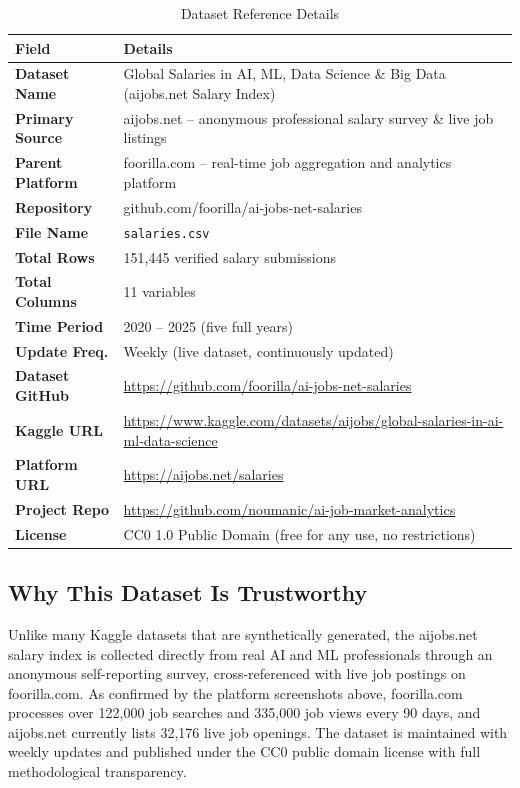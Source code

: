 \documentclass[12pt,a4paper]{article}
\begin{document}
\begin{table}[H]
\centering
\caption{Dataset Reference Details}
\renewcommand{\arraystretch}{1.4}
\begin{tabularx}{\linewidth}{>{\bfseries\color{fastblue}}l W}
\toprule
Field & Details \\
\midrule
Dataset Name    & Global Salaries in AI, ML, Data Science \& Big Data (aijobs.net Salary Index) \\
Primary Source  & aijobs.net -- anonymous professional salary survey \& live job listings \\
Parent Platform & foorilla.com -- real-time job aggregation and analytics platform \\
Repository      & github.com/foorilla/ai-jobs-net-salaries \\
File Name       & \texttt{salaries.csv} \\
Total Rows      & 151{,}445 verified salary submissions \\
Total Columns   & 11 variables \\
Time Period     & 2020 -- 2025 (five full years) \\
Update Freq.    & Weekly (live dataset, continuously updated) \\
Dataset GitHub  & \url{https://github.com/foorilla/ai-jobs-net-salaries} \\
Kaggle URL      & \url{https://www.kaggle.com/datasets/aijobs/global-salaries-in-ai-ml-data-science} \\
Platform URL    & \url{https://aijobs.net/salaries} \\
Project Repo    & \url{https://github.com/noumanic/ai-job-market-analytics} \\
License         & CC0 1.0 Public Domain (free for any use, no restrictions) \\
\bottomrule
\end{tabularx}
\end{table}

\subsection{Why This Dataset Is Trustworthy}

Unlike many Kaggle datasets that are synthetically generated, the aijobs.net salary
index is collected directly from real AI and ML professionals through an anonymous
self-reporting survey, cross-referenced with live job postings on foorilla.com. As
confirmed by the platform screenshots above, foorilla.com processes over 122{,}000 job
searches and 335{,}000 job views every 90 days, and aijobs.net currently lists
32{,}176 live job openings. The dataset is maintained with weekly updates and published
under the CC0 public domain license with full methodological transparency.
\end{document}
